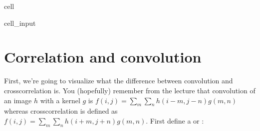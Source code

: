 \documentclass[letterpaper,10pt,english]{jupyterBook}
\begin{document}
\begin{sphinxuseclass}{cell}\begin{sphinxVerbatimInput}

\begin{sphinxuseclass}{cell_input}
\begin{sphinxVerbatim}[commandchars=\\\{\}]
   
    

  \PYG{p}{[}  \PYG{p}{]}

   

 
\end{sphinxVerbatim}

\end{sphinxuseclass}\end{sphinxVerbatimInput}

\end{sphinxuseclass}

\section{Correlation and convolution}
\label{\detokenize{notebooks/Tutorial2_ConvolutionalNeuralNetworks/Tutorial2_ConvolutionalNeuralNetworks_student:correlation-and-convolution}}
\sphinxAtStartPar
First, we’re going to visualize what the difference between convolution and cross\sphinxhyphen{}correlation is. You (hopefully) remember from the lecture that convolution of an image \(h\) with a kernel \(g\) is \(f(i,j) = \sum_m\sum_n h(i-m, j-n)g(m,n)\) whereas cross\sphinxhyphen{}correlation is defined as \(f(i,j) = \sum_m\sum_n h(i+m, j+n)g(m,n)\). First define a  or :
\end{document}
